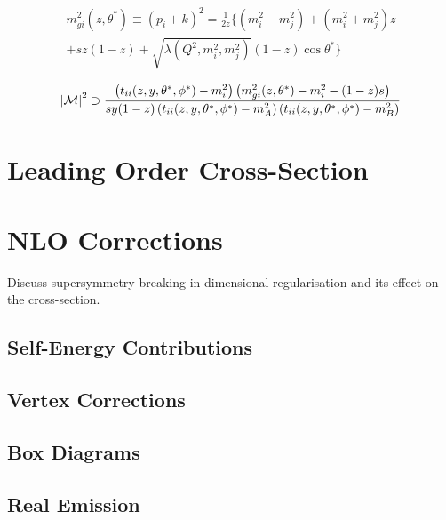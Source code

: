         \begin{align}
            \nonumber
            m^2_{gi}(z, \theta^\ast) \equiv (p_i + k)^2 = \frac{1}{2z} \bigg\{ (m_i^2-m_j^2) + (m_i^2+m_j^2)z \\
            + sz(1-z) + \sqrt{\lambda(Q^2, m_i^2, m_j^2)} (1-z) \cos\theta^\ast \bigg\}
        \end{align}

        \begin{align}
            \left|\mathcal{M}\right|^2 \supset \frac{\left(t_{ii}(z, y, \theta^\ast, \phi^\ast) - m_i^2\right) \left(m^2_{gi}(z, \theta^\ast) - m_i^2 - (1-z)s\right)}{s y (1-z) \left(t_{ii}(z, y, \theta^\ast, \phi^\ast) - m_A^2\right) \left(t_{ii}(z, y, \theta^\ast, \phi^\ast) - m_B^2\right)}
        \end{align}


\section{Leading Order Cross-Section}

\section{NLO Corrections}
    \begin{TODO}
        \item Discuss supersymmetry breaking in dimensional regularisation and its effect on the cross-section.
    \end{TODO}
    \subsection{Self-Energy Contributions}

    \subsection{Vertex Corrections}

    \subsection{Box Diagrams}

    \subsection{Real Emission}
